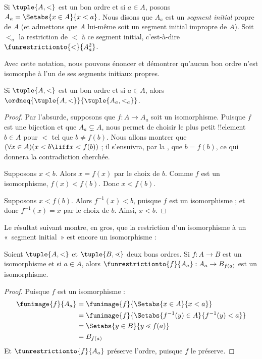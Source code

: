 \documentclass[../../../include/open-logic-section]{subfiles}
\begin{document}
\begin{defn}
Si $\tuple{A, <}$ est un bon ordre et si $a \in A$, posons
$A_a = \Setabs{x \in A}{x < a}$. Nous disons que $A_a$ est un
\emph{segment initial} propre de $A$ (et admettons que $A$ lui-même
soit un segment initial impropre de $A$). Soit $<_a$ la restriction de
$<$ à ce segment initial, c'est-à-dire
$\funrestrictionto{\mathord{<}}{A_a^2}$.
\end{defn}
\noindent
Avec cette notation, nous pouvons énoncer et démontrer qu'aucun bon
ordre n'est isomorphe à l'un de ses segments initiaux propres.

\begin{lem}
Si $\tuple{A, <}$ est un bon ordre et si $a \in A$, alors
$\ordneq{\tuple{A, <}}{\tuple{A_a, <_a}}$.
\end{lem}

\begin{proof}
Par l'absurde, supposons que $f \colon A \to A_a$ soit un
isomorphisme. Puisque $f$ est une bijection et que $A_a \subsetneq A$,
 nous permet de choisir le plus petit
!!{element} $b \in A$ pour $<$ tel que $b \neq f(b)$. Nous allons
montrer que $(\forall x \in A)(x<b \liff x < f(b))$ ; il s'ensuivra,
par la , que
$b = f(b)$, ce qui donnera la contradiction cherchée.

Supposons $x < b$. Alors $x = f(x)$ par le choix de $b$. Comme $f$ est
un isomorphisme, $f(x) < f(b)$. Donc $x < f(b)$.

Supposons $x < f(b)$. Alors $f^{-1}(x) < b$, puisque $f$ est un
isomorphisme ; et donc $f^{-1}(x) = x$ par le choix de $b$. Ainsi,
$x < b$.
\end{proof}

Le résultat suivant montre, en gros, que la restriction d'un
isomorphisme à un «~segment initial~» est encore un isomorphisme :

\begin{lem}
Soient $\tuple{A, <}$ et $\tuple{B, \lessdot}$ deux bons ordres. Si
$f \colon A \to B$ est un isomorphisme et si $a \in A$, alors
$\funrestrictionto{f}{A_{a}} : A_a \to B_{f(a)}$ est un isomorphisme.
\end{lem}

\begin{proof}
Puisque $f$ est un isomorphisme :
\begin{align*}
	\funimage{f}{A_a} &= \funimage{f}{\Setabs{x \in A}{x < a}}\\
	&= \funimage{f}{\Setabs{f^{-1}(y) \in A}{f^{-1}(y) < a}} \\
	&= \Setabs{y \in B}{y \lessdot f(a)} \\
	&=B_{f(a)}
\end{align*}
Et $\funrestrictionto{f}{A_a}$ préserve l'ordre, puisque $f$ le
préserve.
\end{proof}
\end{document}

